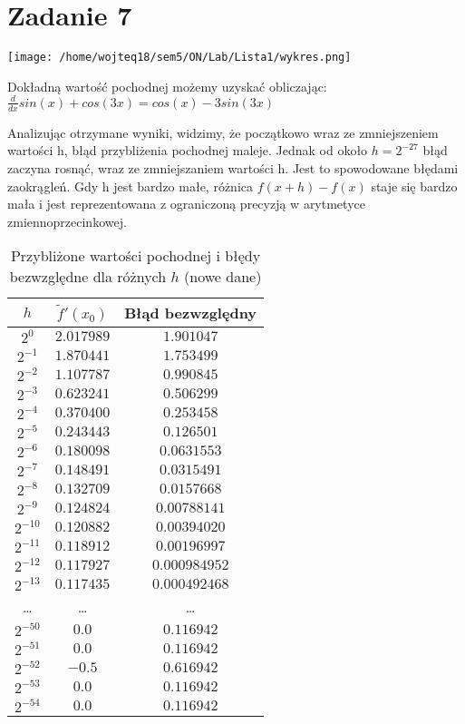 \documentclass{article}
\begin{document}
\section*{Zadanie 7}
\texttt{[image: /home/wojteq18/sem5/ON/Lab/Lista1/wykres.png]}

Dokładną wartość pochodnej możemy uzyskać obliczając: $\frac{d}{dx} sin(x) + cos (3x) = cos(x) - 3sin(3x)$

Analizując otrzymane wyniki, widzimy, że początkowo wraz ze zmniejszeniem wartości h, błąd przybliżenia pochodnej maleje. Jednak od około $ h = 2^{-27}$ błąd zaczyna 
rosnąć, wraz ze zmniejszaniem wartości h. Jest to spowodowane błędami zaokrągleń. Gdy h jest bardzo małe, różnica $f(x+h) - f(x)$ staje się bardzo mała i jest
reprezentowana z ograniczoną precyzją w arytmetyce zmiennoprzecinkowej. 

\begin{table}[h!]
    \centering
    \begin{tabular}{|c|c|c|}
        \hline
        $h$ & $\tilde{f}'(x_0)$ & Błąd bezwzględny \\
        \hline
        $2^{0}$ & $2.017989$ & $1.901047$ \\
        \hline
        $2^{-1}$ & $1.870441$ & $1.753499$ \\
        \hline
        $2^{-2}$ & $1.107787$ & $0.990845$ \\
        \hline
        $2^{-3}$ & $0.623241$ & $0.506299$ \\
        \hline
        $2^{-4}$ & $0.370400$ & $0.253458$ \\
        \hline
        $2^{-5}$ & $0.243443$ & $0.126501$ \\
        \hline
        $2^{-6}$ & $0.180098$ & $0.0631553$ \\
        \hline
        $2^{-7}$ & $0.148491$ & $0.0315491$ \\
        \hline
        $2^{-8}$ & $0.132709$ & $0.0157668$ \\
        \hline
        $2^{-9}$ & $0.124824$ & $0.00788141$ \\
        \hline
        $2^{-10}$ & $0.120882$ & $0.00394020$ \\
        \hline
        $2^{-11}$ & $0.118912$ & $0.00196997$ \\
        \hline
        $2^{-12}$ & $0.117927$ & $0.000984952$ \\
        \hline
        $2^{-13}$ & $0.117435$ & $0.000492468$ \\
        \hline
        \dots & \dots & \dots \\
        \hline
        $2^{-50}$ & $0.0$ & $0.116942$ \\
        \hline
        $2^{-51}$ & $0.0$ & $0.116942$ \\
        \hline
        $2^{-52}$ & $-0.5$ & $0.616942$ \\
        \hline
        $2^{-53}$ & $0.0$ & $0.116942$ \\
        \hline
        $2^{-54}$ & $0.0$ & $0.116942$ \\
        \hline
    \end{tabular}
    \caption{Przybliżone wartości pochodnej i błędy bezwzględne dla różnych $h$ (nowe dane)}
    \label{tab:pochodna_new}
\end{table}
\end{document}
